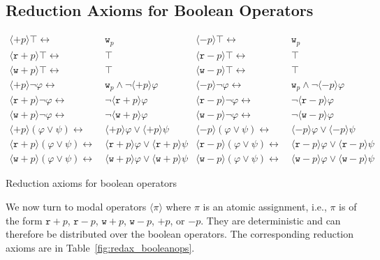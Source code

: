 \documentclass{llncs}
\newcommand{\readable}[1]{\mathtt{r}_{#1}}
\newcommand{\writable}[1]{\mathtt{w}_{#1}}
\newcommand{\assgntopR}[1]{{\mathtt r {+} #1}}
\newcommand{\assgnbotR}[1]{{\mathtt r {-} #1}}
\newcommand{\assgntopW}[1]{{\mathtt w {+} #1}}
\newcommand{\assgnbotW}[1]{{\mathtt w {-} #1}}
\newcommand{\assgntopV}[1]{{\mathtt {+} #1}}
\newcommand{\assgnbotV}[1]{{\mathtt {-} #1}}
\newcommand{\ldia}[1]{ \big\langle #1 \big\rangle}
\newcommand{\leqv}{ \leftrightarrow }
\renewcommand{\phi}{\varphi}
\begin{document}
\subsection{Reduction Axioms for Boolean Operators}\label{sec:redax_atmpgm_bool} 

\begin{table}[t]
\begin{align*}
\ldia{\assgntopV p} \top \leqv &\  \writable p
& \ldia{\assgnbotV p} \top \leqv &\  \writable p
\\
\ldia{\assgntopR p} \top \leqv &\ \top
& \ldia{\assgnbotR p} \top \leqv &\ \top
\\
\ldia{\assgntopW p} \top \leqv &\ \top
& \ldia{\assgnbotW p} \top \leqv &\ \top
%
\\
\ldia{\assgntopV p } \lnot \phi \leqv &\ 
					\writable{p} \land \lnot \ldia{\assgntopV p } \phi  
& \ldia{\assgnbotV p } \lnot \phi \leqv &\ 
					\writable{p} \land \lnot \ldia{\assgnbotV p } \phi 
\\
\ldia{\assgntopR p } \lnot \phi \leqv &\ 
					\lnot \ldia{\assgntopR p } \phi  
& \ldia{\assgnbotR p } \lnot \phi \leqv &\ 
					\lnot \ldia{\assgnbotR p } \phi 
\\
\ldia{\assgntopW p } \lnot \phi \leqv &\ 
					\lnot \ldia{\assgntopW p } \phi  
& \ldia{\assgnbotW p } \lnot \phi \leqv &\ 
					\lnot \ldia{\assgnbotW p } \phi 
%
\\
\ldia{\assgntopV p } (\phi \lor \psi) \leqv &\ \ldia{\assgntopV p } \phi \lor \ldia{\assgntopV p } \psi 
& \ldia{\assgnbotV p } (\phi \lor \psi) \leqv &\ \ldia{\assgnbotV p } \phi \lor \ldia{\assgnbotV p } \psi 
\\
\ldia{\assgntopR p } (\phi \lor \psi) \leqv &\ \ldia{\assgntopR p } \phi \lor \ldia{\assgntopR p } \psi 
& \ldia{\assgnbotR p } (\phi \lor \psi) \leqv &\ \ldia{\assgnbotR p } \phi \lor \ldia{\assgnbotR p } \psi 
\\
\ldia{\assgntopW p } (\phi \lor \psi) \leqv &\ \ldia{\assgntopW p } \phi \lor \ldia{\assgntopW p } \psi 
& \ldia{\assgnbotW p } (\phi \lor \psi) \leqv &\ \ldia{\assgnbotW p } \phi \lor \ldia{\assgnbotW p } \psi 
\end{align*}
\caption{Reduction axioms for boolean operators
\label{fig:redax_booleanops}
}
\end{table}

We now turn to modal operators $\ldia \pi$ where $\pi$ is an atomic assignment, i.e., $\pi$ is of the form 
$\assgntopR p $, $\assgnbotR p $,
$\assgntopW p $, $\assgnbotW p $, 
$\assgntopV p $, or $\assgnbotV p $. 
They are deterministic and can therefore be distributed over the boolean operators.
The corresponding reduction axioms are in Table~\ref{fig:redax_booleanops}.
\end{document}
